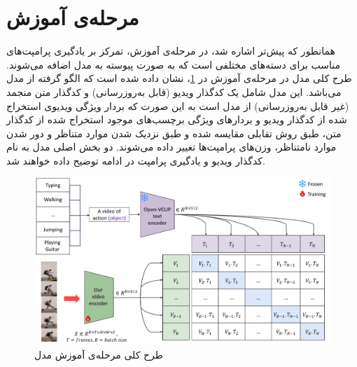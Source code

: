 \section{مرحله‌ی آموزش }
همانطور که پیش‌تر اشاره شد، در مرحله‌ی آموزش، تمرکز بر یادگیری پرامپت‌های مناسب برای دسته‌های مختلفی است که به صورت پیوسته به مدل اضافه می‌شوند. طرح کلی مدل در مرحله‌ی آموزش در \cref{fig.33}، نشان داده شده است که الگو گرفته از مدل  می‌باشد. این مدل شامل یک کدگذار ویدیو (قابل به‌روزرسانی) و کدگذار متن منجمد (غیر قابل به‌روزرسانی) از مدل  است به این صورت که بردار ویژگی ویدیوی استخراج شده از کدگذار ویدیو و بردارهای ویژگی برچسب‌های موجود استخراج شده از کدگذار متن، طبق روش تقابلی مقایسه شده و طبق نزدیک شدن موارد متناظر و دور شدن موارد نامتناظر، وزن‌های پرامپت‌ها تغییر داده می‌شوند. دو بخش اصلی مدل به نام کدگذار ویدیو و یادگیری پرامپت در ادامه توضیح داده خواهند شد. 
‌\begin{figure}
	\centering\includegraphics[scale=.50]{Images/Chapter3/train_phase.png}
	\caption[]{طرح کلی مرحله‌ی آموزش مدل }
	\label{fig.33}
\end{figure}
